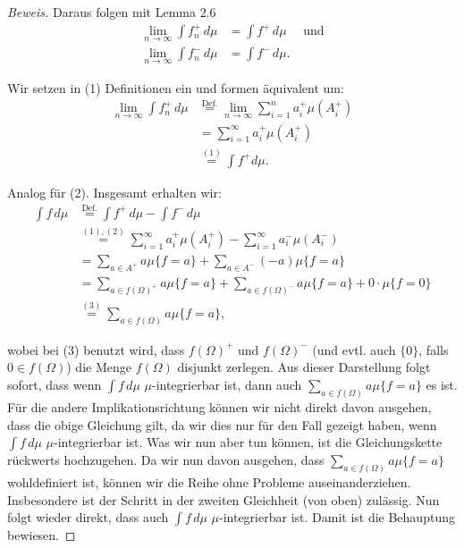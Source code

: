 \documentclass[10pt]{article}
\begin{document}
\begin{proof}[Beweis]
  Daraus folgen mit Lemma $2.6$ 
  \begin{align}
    \lim_{n\to\infty} \int f_n^{+} \,d\mu &= \int f^{+} \,d\mu \quad \text{ und} \\
    \lim_{n\to\infty} \int f_n^{-} \,d\mu &= \int f^{-} \,d\mu. 
  \end{align}

  Wir setzen in (1) Definitionen ein und formen äquivalent um:
  \begin{align*}
    \lim_{n\to\infty} \int f_n^{+} \,d\mu &\overset{\text{Def.}}{=} \lim_{n\to\infty}\sum_{i=1}^{n} a_i^{+}\mu(A_i^+) \\
                                          &= \sum_{i=1}^{\infty} a_i^{+}\mu(A_i^+) \\
                                          &\overset{(1)}{=} \int f^+ d\mu .
  \end{align*}

  Analog für (2). Insgesamt erhalten wir:
  \begin{align*}
    \int f\,d\mu &\overset{\text{Def.}}{=} \int f^+\,d\mu - \int f^-\,d\mu \\
                 &\overset{(1),(2)}{=}  \sum_{i=1}^{\infty} a_i^{+}\mu(A_i^+) - \sum_{i=1}^{\infty} a_i^{-}\mu(A_i^-) \\
                 &= \sum_{a\in A^+} a\mu\{f = a\} + \sum_{a\in A^-} (-a)\mu\{f = a\} \\
                 &= \sum_{a\in f(\Omega)^+} a\mu\{f = a\} + \sum_{a\in f(\Omega)^-} a\mu\{f = a\} + 0\cdot \mu\{f = 0\}\\
                 &\overset{(3)}{=} \sum_{a\in f(\Omega)} a \mu\{f = a\},
  \end{align*}

  wobei bei (3) benutzt wird, dass $f(\Omega)^+$ und $f(\Omega)^-$
  (und evtl. auch $\{0\}$, falls $0\in f(\Omega)$) die Menge $f(\Omega)$ disjunkt zerlegen.  
  Aus dieser Darstellung folgt sofort, dass wenn $\int f\,d\mu$ $\mu$-integrierbar ist, dann auch
  $\sum_{a\in f(\Omega)} a \mu\{f = a\}$ es ist. Für die andere Implikationsrichtung können wir 
  nicht direkt davon ausgehen, dass die obige Gleichung gilt, da wir dies nur für den Fall gezeigt haben, 
  wenn $\int f\,d\mu$ $\mu$-integrierbar ist. Was wir nun aber tun können, ist die Gleichungskette rückwerts 
  hochzugehen. Da wir nun davon ausgehen, dass $\sum_{a\in f(\Omega)} a \mu\{f = a\}$ wohldefiniert ist, 
  können wir die Reihe ohne Probleme auseinanderziehen. Insbesondere ist der Schritt in der zweiten Gleichheit 
  (von oben) zulässig.
  Nun folgt wieder direkt, dass auch $\int f\,d\mu$ $\mu$-integrierbar ist. 
  Damit ist die Behauptung bewiesen.
\end{proof}
\end{document}
